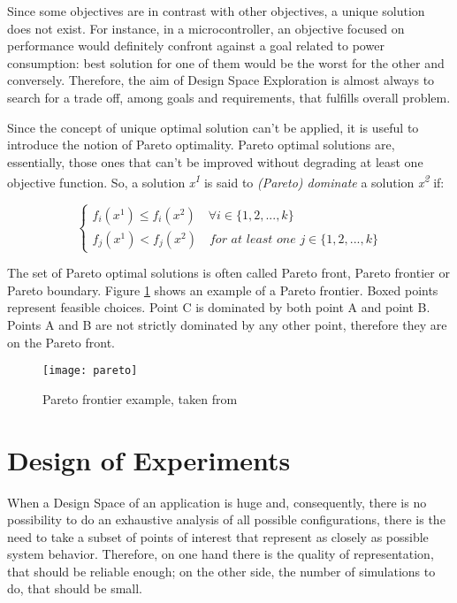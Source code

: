 Since some objectives are in contrast with other objectives, a unique solution does not exist. For instance, in a microcontroller, an objective focused on performance would definitely confront against a goal related to power consumption: best solution for one of them would be the worst for the other and conversely. Therefore, the aim of Design Space Exploration is almost always to search for a trade off, among goals and requirements, that fulfills overall problem.

Since the concept of unique optimal solution can't be applied, it is useful to introduce the notion of Pareto optimality. Pareto optimal solutions are, essentially, those ones that can't be improved without degrading at least one objective function. So, a solution \textit{x\textsuperscript{1}} is said to \textit{(Pareto) dominate} a solution \textit{x\textsuperscript{2}} if:

\begin{equation}
\begin{cases}
        f_i(x^1) \le f_i(x^2) \quad \forall i \in \{1, 2, ..., k\} \\
        f_j(x^1) < f_j(x^2) \quad \textit{for at least one } j \in \{1, 2, ..., k\}
\end{cases}
\end{equation}

The set of Pareto optimal solutions is often called Pareto front, Pareto frontier or Pareto boundary. Figure \ref{fig::pareto} shows an example of a Pareto frontier. Boxed points represent feasible choices. Point C is dominated by both point A and point B. Points A and B are not strictly dominated by any other point, therefore they are on the Pareto front.

\begin{figure}[htb]

    \centering
    \texttt{[image: pareto]}
    \caption[Pareto frontier example]{Pareto frontier example, taken from \cite{wiki:pareto}}
    \label{fig::pareto}

\end{figure}





\section{Design of Experiments}\label{doe}

When a Design Space of an application is huge and, consequently, there is no possibility to do an exhaustive analysis of all possible configurations, there is the need to take a subset of points of interest that represent as closely as possible system behavior. Therefore, on one hand there is the quality of representation, that should be reliable enough; on the other side, the number of simulations to do, that should be small.

